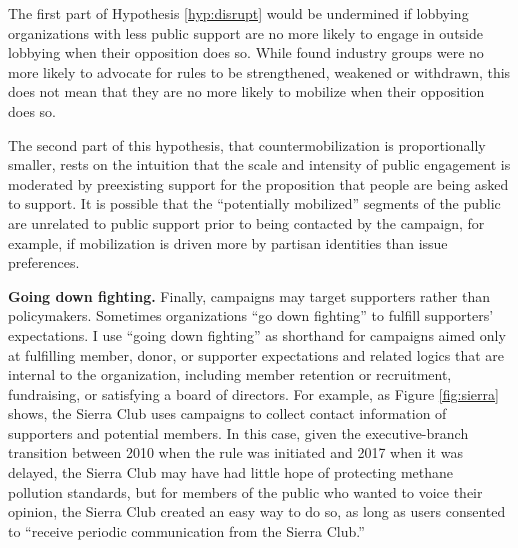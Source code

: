 \begin{subhyp}
The first part of Hypothesis \ref{hyp:disrupt} would be undermined if lobbying organizations with less public support are no more likely to engage in outside lobbying when their opposition does so. While \citet{Potter2017} found industry groups were no more likely to advocate for rules to be strengthened, weakened or withdrawn, this does not mean that they are no more likely to mobilize when their opposition does so.

The second part of this hypothesis, that countermobilization is proportionally smaller, rests on the intuition that the scale and intensity of public engagement is moderated by preexisting support for the proposition that people are being asked to support. It is possible that the ``potentially mobilized'' segments of the public are unrelated to public support prior to being contacted by the campaign, for example, if mobilization is driven more by partisan identities than issue preferences.

\textbf{Going down fighting.} Finally, campaigns may target supporters rather than policymakers. Sometimes organizations ``go down fighting'' to fulfill supporters' expectations.
I use ``going down fighting'' as shorthand for campaigns aimed only at fulfilling member, donor, or supporter expectations and related logics that are internal to the organization, including member retention or recruitment, fundraising, or satisfying a board of directors. For example, as Figure \ref{fig:sierra} shows, the Sierra Club uses campaigns to collect contact information of supporters and potential members. In this case, given the executive-branch transition between 2010 when the rule was initiated and 2017 when it was delayed, the Sierra Club may have had little hope of protecting methane pollution standards, but for members of the public who wanted to voice their opinion, the Sierra Club created an easy way to do so, as long as users consented to ``receive periodic communication from the Sierra Club.'' 


\end{subhyp}

